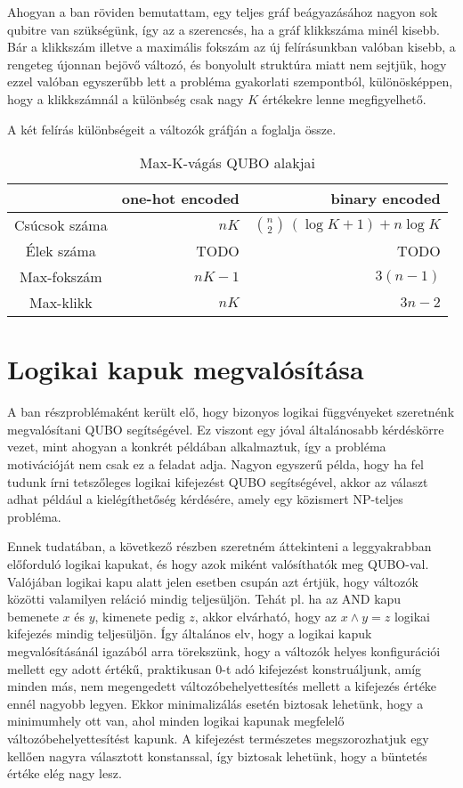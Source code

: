 Ahogyan a ban röviden bemutattam, egy teljes gráf beágyazásához nagyon sok qubitre van szükségünk, így az a szerencsés, ha a gráf klikkszáma minél kisebb. Bár a klikkszám illetve a maximális fokszám az új felírásunkban valóban kisebb, a rengeteg újonnan bejövő változó, és bonyolult struktúra miatt nem sejtjük, hogy ezzel valóban egyszerűbb lett a probléma gyakorlati szempontból, különösképpen, hogy a klikkszámnál a különbség csak nagy $K$ értékekre lenne megfigyelhető.

A két felírás különbségeit a változók gráfján a  foglalja össze.


\begin{table}[ht]
	\footnotesize
	\centering
	\begin{tabular}{ c r r }
		\toprule
		  & one-hot encoded & binary encoded \\
		\midrule
		Csúcsok száma  & $n K$     & $\binom{n}{2} \, ( \log K + 1 ) + n \log K$ \\
		Élek száma & TODO & TODO \\
		Max-fokszám    & $n K - 1 $ & $3(n-1)$ \\
		Max-klikk      & $n K$     & $3n-2$ \\		
		\bottomrule
	\end{tabular}
	\caption{Max-K-vágás QUBO alakjai}
	\label{tab:diffMaxKCutFormulas}
\end{table}

  

\section{Logikai kapuk megvalósítása}

A ban részproblémaként került elő, hogy bizonyos logikai függvényeket szeretnénk megvalósítani QUBO segítségével. Ez viszont egy jóval általánosabb kérdéskörre vezet, mint ahogyan a konkrét példában alkalmaztuk, így a probléma motivációját nem csak ez a feladat adja. Nagyon egyszerű példa, hogy ha fel tudunk írni tetszőleges logikai kifejezést QUBO segítségével, akkor az választ adhat például a kielégíthetőség kérdésére, amely egy közismert NP-teljes probléma\cite{algoritmusokBook}.

Ennek tudatában, a következő részben szeretném áttekinteni a leggyakrabban előforduló logikai kapukat, és hogy azok miként valósíthatók meg QUBO-val. Valójában logikai kapu alatt jelen esetben csupán azt értjük, hogy változók közötti valamilyen reláció mindig teljesüljön. Tehát pl. ha az AND kapu bemenete $x$ és $y$, kimenete pedig $z$, akkor elvárható, hogy az $x \wedge y = z$ logikai kifejezés mindig teljesüljön. Így általános elv, hogy a logikai kapuk megvalósításánál igazából arra törekszünk, hogy a változók helyes konfigurációi mellett egy adott értékű, praktikusan 0-t adó kifejezést konstruáljunk, amíg minden más, nem megengedett változóbehelyettesítés mellett a kifejezés értéke ennél nagyobb legyen. Ekkor minimalizálás esetén biztosak lehetünk, hogy a minimumhely ott van, ahol minden logikai kapunak megfelelő változóbehelyettesítést kapunk. A kifejezést természetes megszorozhatjuk egy kellően nagyra választott konstanssal, így biztosak lehetünk, hogy a büntetés értéke elég nagy lesz.

